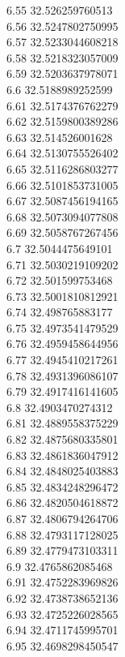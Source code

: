 {6.55	32.526259760513\\
6.56	32.5247802750995\\
6.57	32.5233044608218\\
6.58	32.5218323057009\\
6.59	32.5203637978071\\
6.6	32.5188989252599\\
6.61	32.5174376762279\\
6.62	32.5159800389286\\
6.63	32.514526001628\\
6.64	32.5130755526402\\
6.65	32.5116286803277\\
6.66	32.5101853731005\\
6.67	32.5087456194165\\
6.68	32.5073094077808\\
6.69	32.5058767267456\\
6.7	32.5044475649101\\
6.71	32.5030219109202\\
6.72	32.501599753468\\
6.73	32.5001810812921\\
6.74	32.498765883177\\
6.75	32.4973541479529\\
6.76	32.4959458644956\\
6.77	32.4945410217261\\
6.78	32.4931396086107\\
6.79	32.4917416141605\\
6.8	32.4903470274312\\
6.81	32.4889558375229\\
6.82	32.4875680335801\\
6.83	32.4861836047912\\
6.84	32.4848025403883\\
6.85	32.4834248296472\\
6.86	32.4820504618872\\
6.87	32.4806794264706\\
6.88	32.4793117128025\\
6.89	32.4779473103311\\
6.9	32.4765862085468\\
6.91	32.4752283969826\\
6.92	32.4738738652136\\
6.93	32.4725226028565\\
6.94	32.4711745995701\\
6.95	32.4698298450547\\
}
